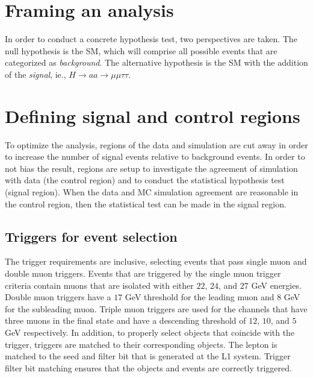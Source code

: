 \section{Framing an analysis}
In order to conduct a concrete hypothesis test, two perspectives are taken. 
The null hypothesis is the SM, which will comprise all possible events that are categorized as \textit{background}.
The alternative hypothesis is the SM with the addition of the \textit{signal}, ie., $H \rightarrow a a \rightarrow \mu\mu\tau\tau$. 

\section{Defining signal and control regions}
To optimize the analysis, regions of the data and simulation are cut away in order to increase the number of signal events relative to background events.  In order to not bias the result, regions are setup to investigate the agreement of simulation with data (the control region) and to conduct the statistical hypothesis test (signal region). When the data and MC simulation agreement are reasonable in the control region, then the statistical test can be made in the signal region.  

\subsection{Triggers for event selection}
\label{sec:trig}
The trigger requirements are inclusive, selecting events that pass single muon and double muon triggers. Events that are triggered by the single muon trigger criteria contain muons that are isolated with either $22$, $24$, and $27$ GeV energies. Double muon triggers have a $17$ GeV threshold for the leading muon and $8$ GeV for the subleading muon. Triple muon triggers are used for the channels that have three muons in the final state and have a descending threshold of $12$, $10$, and $5$ GeV respectively. In addition, to properly select objects that coincide with the trigger, triggers are matched to their corresponding objects. The lepton is matched to the seed and filter bit that is generated at the L1 system. Trigger filter bit matching ensures that the objects and events are correctly triggered. 

